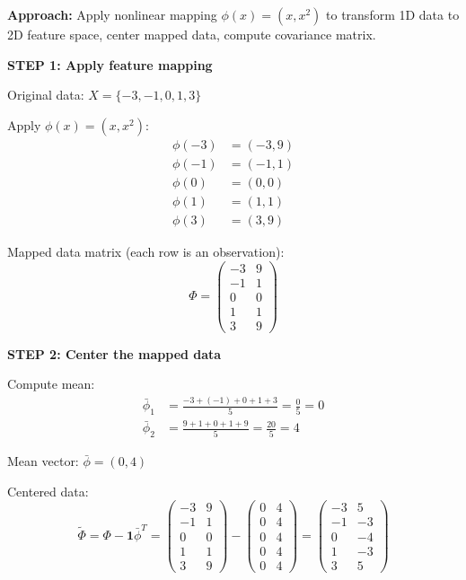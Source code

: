 \documentclass[12pt]{article}
\begin{document}
\begin{solution}

\textbf{Approach:} Apply nonlinear mapping $\phi(x) = (x, x^2)$ to transform 1D data to 2D feature space, center mapped data, compute covariance matrix.

\textbf{STEP 1: Apply feature mapping}

Original data: $X = \{-3, -1, 0, 1, 3\}$

Apply $\phi(x) = (x, x^2)$:
\begin{align*}
\phi(-3) &= (-3, 9) \\
\phi(-1) &= (-1, 1) \\
\phi(0) &= (0, 0) \\
\phi(1) &= (1, 1) \\
\phi(3) &= (3, 9)
\end{align*}

Mapped data matrix (each row is an observation):
\[
\Phi = \begin{pmatrix}
-3 & 9 \\
-1 & 1 \\
0 & 0 \\
1 & 1 \\
3 & 9
\end{pmatrix}
\]

\textbf{STEP 2: Center the mapped data}

Compute mean:
\begin{align*}
\bar{\phi}_1 &= \frac{-3 + (-1) + 0 + 1 + 3}{5} = \frac{0}{5} = 0 \\
\bar{\phi}_2 &= \frac{9 + 1 + 0 + 1 + 9}{5} = \frac{20}{5} = 4
\end{align*}

Mean vector: $\bar{\phi} = (0, 4)$

Centered data:
\[
\tilde{\Phi} = \Phi - \mathbf{1}\bar{\phi}^T = \begin{pmatrix}
-3 & 9 \\
-1 & 1 \\
0 & 0 \\
1 & 1 \\
3 & 9
\end{pmatrix} - \begin{pmatrix}
0 & 4 \\
0 & 4 \\
0 & 4 \\
0 & 4 \\
0 & 4
\end{pmatrix} = \begin{pmatrix}
-3 & 5 \\
-1 & -3 \\
0 & -4 \\
1 & -3 \\
3 & 5
\end{pmatrix}
\]


\end{solution}
\end{document}
